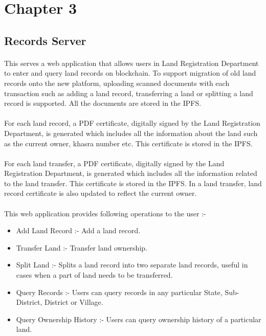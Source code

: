 \documentclass{article}
\begin{document}
\section{Chapter 3}
    \subsection{Records Server}
        \paragraph{}
        This serves a web application that allows users in Land Registration Department to enter and query land records on blockchain. To support migration of old land records onto the new platform, uploading scanned documents with each transaction such as adding a land record, transferring a land or splitting a land record is supported. All the documents are stored in the IPFS.

        \paragraph{}
        For each land record, a PDF certificate, digitally signed by the Land Registration Department, is generated which includes all the information about the land such as the current owner, khasra number etc. This certificate is stored in the IPFS.
        
        \paragraph{}
        For each land transfer, a PDF certificate, digitally signed by the Land Registration Department, is generated which includes all the information related to the land transfer. This certificate is stored in the IPFS. In a land transfer, land record certificate is also updated to reflect the current owner.

        \paragraph{}
        This web application provides following operations to the user :-
        \begin{itemize}
            \item Add Land Record :- Add a land record.
            \item Transfer Land :- Transfer land ownership.
            \item Split Land :- Splits a land record into two separate land records, useful in cases when a part of land needs to be transferred.
            \item Query Records :- Users can query records in any particular State, Sub-District, District or Village.
            \item Query Ownership History :- Users can query ownership history of a particular land.
        \end{itemize}
\end{document}
